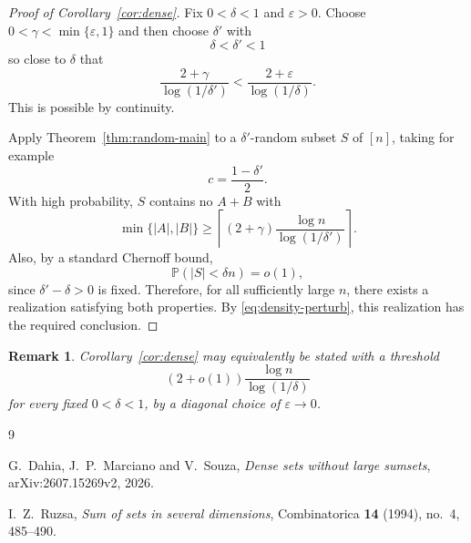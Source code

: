 \documentclass[11pt]{article}
\newtheorem{remark}[theorem]{Remark}
\newcommand{\Prob}{\mathbb{P}}
\newcommand{\eps}{\varepsilon}
\begin{document}
\begin{proof}[Proof of Corollary~\ref{cor:dense}]
Fix $0<\delta<1$ and $\eps>0$.  Choose $0<\gamma<\min\{\eps,1\}$ and then choose $\delta'$ with
\[
 \delta<\delta'<1
\]
so close to $\delta$ that
\begin{equation}\label{eq:density-perturb}
 \frac{2+\gamma}{\log(1/\delta')}
 <
 \frac{2+\eps}{\log(1/\delta)}.
\end{equation}
This is possible by continuity.

Apply Theorem~\ref{thm:random-main} to a $\delta'$-random subset $S$ of $[n]$, taking for example
\[
 c=\frac{1-\delta'}2.
\]
With high probability, $S$ contains no $A+B$ with
\[
 \min\{|A|,|B|\}\ge
 \left\lceil(2+\gamma)\frac{\log n}{\log(1/\delta')}\right\rceil.
\]
Also, by a standard Chernoff bound,
\[
 \Prob(|S|<\delta n)=o(1),
\]
since $\delta'-\delta>0$ is fixed.  Therefore, for all sufficiently large $n$, there exists a realization satisfying both properties.  By \eqref{eq:density-perturb}, this realization has the required conclusion.
\end{proof}

\begin{remark}
Corollary~\ref{cor:dense} may equivalently be stated with a threshold
\[
 \left(2+o(1)\right)\frac{\log n}{\log(1/\delta)}
\]
for every fixed $0<\delta<1$, by a diagonal choice of $\eps\to0$.
\end{remark}

\begin{thebibliography}{9}

G.~Dahia, J.~P.~Marciano and V.~Souza,
\emph{Dense sets without large sumsets},
arXiv:2607.15269v2, 2026.

I.~Z.~Ruzsa,
\emph{Sum of sets in several dimensions},
Combinatorica \textbf{14} (1994), no.~4, 485--490.

\end{thebibliography}
\end{document}
